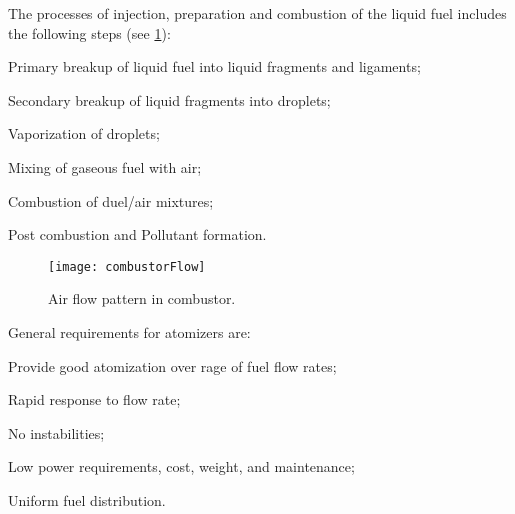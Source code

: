 The processes of injection, preparation and combustion of the liquid fuel includes the following steps (see \cref{FIG_COMBUSTOR_FLOW}):
\begin{itemizePacked}
\item Primary breakup of liquid fuel into liquid fragments and ligaments;
\item Secondary breakup of liquid fragments into droplets;
\item Vaporization of droplets;
\item Mixing of gaseous fuel with air;
\item Combustion of duel/air mixtures;
\item Post combustion and Pollutant formation.
\end{itemizePacked}
\begin{figure}[!htb!]
\begin{center}
  \texttt{[image: combustorFlow]}
  \caption{\label{FIG_COMBUSTOR_FLOW}Air flow pattern in combustor.}
\end{center}
\end{figure}
General requirements for atomizers are:
\begin{itemizePacked}
\item Provide good atomization over rage of fuel flow rates;
\item Rapid response to flow rate;
\item No instabilities;
\item Low power requirements, cost, weight, and maintenance;
\item Uniform fuel distribution.
\end{itemizePacked}

